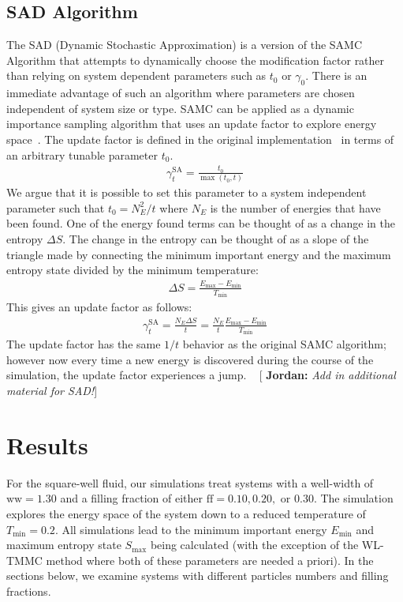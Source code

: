 \documentclass[letterpaper,twocolumn,amsmath,amssymb,pre,aps,10pt]{revtex4-1}
\newcommand{\blue}[1]{{\bf \color{blue} #1}}
\newcommand{\jpsays}[1]{{\color{red} [\blue{Jordan:} \emph{#1}]}}
\begin{document}
\subsection{SAD Algorithm}
The SAD (Dynamic Stochastic Approximation) is a version of the SAMC
Algorithm that attempts to dynamically choose the modification factor
rather than relying on system dependent parameters such as $t_0$ or
$\gamma_0$.  There is an immediate advantage of such an algorithm where
parameters are chosen independent of system size or type. SAMC can be
applied as a dynamic importance sampling algorithm that uses an update
factor to explore energy space~\cite{liang2007stochastic,
werlich2015stochastic, schneider2017convergence}.  The update factor is
defined in the original implementation~\cite{liang2007stochastic} in
terms of an arbitrary tunable parameter $t_0$.
\begin{align}
\gamma_{t}^{\text{SA}} = \frac{t_0}{\max(t_0,t)}
\end{align}
We argue that it is possible to set this parameter to a system
independent parameter such that $t_0 = N_E^2/t$ where $N_E$ is the
number of energies that have been found.  One of the energy found terms
can be thought of as a change in the entropy $\Delta S$.  The change in
the entropy can be thought of as a slope of the triangle made by
connecting the minimum important energy and the maximum entropy state
divided by the minimum temperature:
\begin{align}
\Delta S = \frac{E_{\text{max}}-E_{\text{min}}}{T_{\text{min}}}
\end{align}
This gives an update factor as follows:
\begin{align}
\gamma_{t}^{\text{SA}} = \frac{N_E\Delta S}{t} =
\frac{N_E}{t}\frac{E_{\text{max}}-E_{\text{min}}}{T_{\text{min}}}
\end{align}
The update factor has the same $1/t$ behavior as the original SAMC
algorithm; however now every time a new energy is discovered during the
course of the simulation, the update factor experiences a jump.
~\jpsays{Add in additional material for SAD!}

\section{Results}

For the square-well fluid, our simulations treat systems with a
well-width of $\text{ww} = 1.30$ and a filling fraction of either
$\text{ff} = 0.10, 0.20,$ or $0.30$.  The simulation explores the
energy space of the system down to a reduced temperature of
$T_{\text{min}} = 0.2$.  All simulations lead to the minimum important
energy $E_{\text{min}}$ and maximum entropy state $S_{\text{max}}$
being calculated (with the exception of the WL-TMMC method where both
of these parameters are needed a priori).  In the sections below, we
examine systems with different particles numbers and filling fractions.
\end{document}
